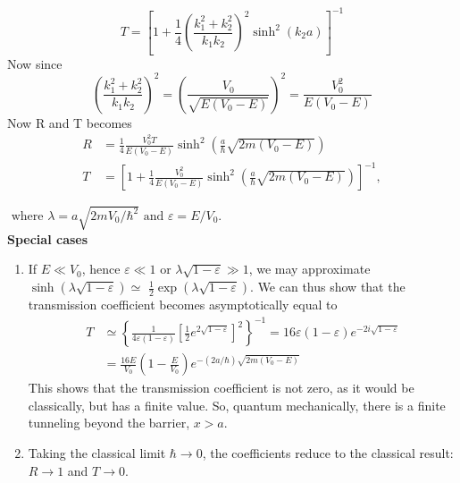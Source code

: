 $$T=\left[1+\frac{1}{4}\left(\frac{k_{1}^{2}+k_{2}^{2}}{k_{1} k_{2}}\right)^{2} \sinh ^{2}\left(k_{2} a\right)\right]^{-1} $$
Now since
$$
\left(\frac{k_{1}^{2}+k_{2}^{2}}{k_{1} k_{2}}\right)^{2}=\left(\frac{V_{0}}{\sqrt{E\left(V_{0}-E\right)}}\right)^{2}=\frac{V_{0}^{2}}{E\left(V_{0}-E\right)}
$$
Now R and T becomes\\
$$\begin{aligned}
	R &=\frac{1}{4} \frac{V_{0}^{2} T}{E\left(V_{0}-E\right)} \sinh ^{2}\left(\frac{a}{\hbar} \sqrt{2 m\left(V_{0}-E\right)}\right) \\
	T &=\left[1+\frac{1}{4} \frac{V_{0}^{2}}{E\left(V_{0}-E\right)} \sinh ^{2}\left(\frac{a}{\hbar} \sqrt{2 m\left(V_{0}-E\right)}\right)\right]^{-1},
\end{aligned}$$
\begin{center}
\end{center}
$\text { where } \lambda=a \sqrt{2 m V_{0} / \hbar^{2}} \text { and } \varepsilon=E / V_{0} \text {. }$\\
\textbf{Special cases}
\begin{enumerate}
	\item  If $E \ll V_{0}$, hence $\varepsilon \ll 1$ or $\lambda \sqrt{1-\varepsilon} \gg 1$, we may approximate $\sinh (\lambda \sqrt{1-\varepsilon}) \simeq$ $\frac{1}{2} \exp (\lambda \sqrt{1-\varepsilon})$. We can thus show that the transmission coefficient becomes asymptotically equal to
	$$
	\begin{aligned}
	T & \simeq\left\{\frac{1}{4 \varepsilon(1-\varepsilon)}\left[\frac{1}{2} e^{2 \sqrt{1-\varepsilon}}\right]^{2}\right\}^{-1}=16 \varepsilon(1-\varepsilon) e^{-2 i \sqrt{1-\varepsilon}} \\
	&=\frac{16 E}{V_{0}}\left(1-\frac{E}{V_{0}}\right) e^{-(2 a / \hbar) \sqrt{2 m\left(V_{0}-E\right)}}
	\end{aligned}
	$$
	This shows that the transmission coefficient is not zero, as it would be classically, but has a finite value. So, quantum mechanically, there is a finite tunneling beyond the barrier, $x>a$.
	\item Taking the classical limit $\hbar \rightarrow 0$, the coefficients reduce to the classical result: $R \rightarrow 1$ and $T \rightarrow 0$.
\end{enumerate}
